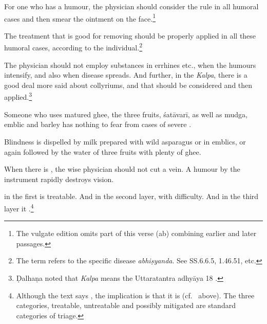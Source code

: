 \begin{translation}
    \item[43] For one who has a humour, the physician should consider the rule in
    all humoral cases and then smear the ointment on the face.\footnote{The vulgate
    edition omits part of this verse (ab) combining earlier and later passages.}
    
    The treatment that is good for removing  should be 
    properly
    applied in all these humoral cases, according to the individual.\footnote{The term
     refers to the specific disease \emph{abhiṣyanda}.  See
    SS.6.6.5, 1.46.51, etc.}
    
    \item[44] %
    
    The physician should not employ substances in errhines etc., when the
humours intensify, and also when disease spreads.  And further, in
the \emph{Kalpa}, there is a good deal more said about
collyriums, and that should be considered and
then applied.\footnote{Ḍalhaṇa noted that \emph{Kalpa} means the
    Uttaratantra adhyāya 18 \citep[633\,ff]{vulgate}.}
    
\item[45] Someone who uses matured ghee, the three fruits,
\gls{śatāvarī},
as well as \gls{mudga}, 
emblic and barley has nothing to fear from cases of severe
.
    
    \item[46] Blindness is dispelled by milk prepared with wild asparagus or in
    emblics, or again  followed by the water of three
    fruits with plenty of ghee.
    
    \item[47]
    
    When there is , the wise physician should
    not cut a vein.  A humour  by the instrument rapidly
    destroys vision.
    
    \item[48] 
    
     in the first  is
    treatable.  And  in the second layer, with
    difficulty.
    And in the third layer it .\footnote{Although the text 
    says , the
implication is that it is  (cf.\ 
above). The three categories, treatable, untreatable and possibly mitigated are 
standard categories of triage.}
    

\end{translation}
